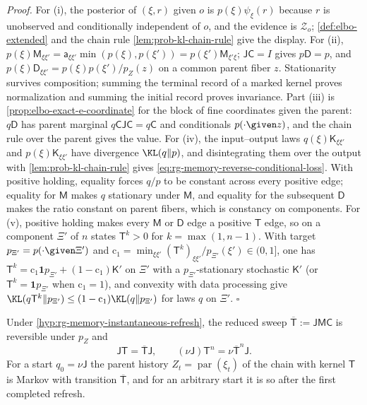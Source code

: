 \noindent\emph{Proof.}
For (i), the posterior of $(\xi,r)$ given $o$ is $p(\xi)\psi_\xi(r)$ because $r$
is unobserved and conditionally independent of $o$, and the evidence is
$\mathcal Z_o$; \cref{def:elbo-extended} and the chain rule
\cref{lem:prob-kl-chain-rule} give the display. For (ii),
$p(\xi)\mathsf M_{\xi\xi'}=\mathsf a_{\xi\xi'}\min(p(\xi),p(\xi'))=p(\xi')\mathsf M_{\xi'\xi}$;
$\mathsf J\mathsf C=I$ gives $p\mathsf D=p$, and
$p(\xi)\mathsf D_{\xi\xi'}=p(\xi)p(\xi')/p_Z(z)$ on a common parent fiber $z$.
Stationarity survives composition; summing the terminal record of a marked kernel
proves normalization and summing the initial record proves invariance. Part (iii) is
\cref{prop:elbo-exact-e-coordinate} for the block of fine coordinates given the
parent: $q\mathsf D$ has parent marginal $q\mathsf C\mathsf J\mathsf C=q\mathsf C$ and
conditionals $p(\cdot\given z)$, and the chain rule over the parent gives the value.
For (iv), the input--output laws $q(\xi)\mathsf K_{\xi\xi'}$ and
$p(\xi)\mathsf K_{\xi\xi'}$ have divergence $\KL(q\Vert p)$, and disintegrating them
over the output with \cref{lem:prob-kl-chain-rule} gives
\eqref{eq:rg-memory-reverse-conditional-loss}. With positive holding, equality forces
$q/p$ to be constant across every positive edge; equality for $\mathsf M$ makes $q$
stationary under $\mathsf M$, and equality for the subsequent $\mathsf D$ makes the
ratio constant on parent fibers, which is constancy on components. For (v), positive
holding makes every $\mathsf M$ or $\mathsf D$ edge a positive $\mathsf T$ edge, so on
a component $\Xi'$ of $n$ states $\mathsf T^k>0$ for $k=\max(1,n-1)$. With target
$p_{\Xi'}=p(\cdot\given\Xi')$ and
$\mathrm c_1=\min_{\xi\xi'}(\mathsf T^k)_{\xi\xi'}/p_{\Xi'}(\xi')\in(0,1]$, one has
$\mathsf T^k=\mathrm c_1\mathbf 1p_{\Xi'}+(1-\mathrm c_1)\mathsf K'$ on $\Xi'$ with a
$p_{\Xi'}$-stationary stochastic $\mathsf K'$ (or $\mathsf T^k=\mathbf 1p_{\Xi'}$ when
$\mathrm c_1=1$), and convexity with data processing give
$\KL(q\mathsf T^k\Vert p_{\Xi'})\leq(1-\mathrm c_1)\KL(q\Vert p_{\Xi'})$ for laws $q$ on
$\Xi'$. $\square$

Under \cref{hyp:rg-memory-instantaneous-refresh}, the reduced sweep
$\overline{\mathsf T}:=\mathsf J\mathsf M\mathsf C$ is reversible under $p_Z$ and
\begin{equation}
\mathsf J\mathsf T=\overline{\mathsf T}\mathsf J,
\qquad
(\nu\mathsf J)\mathsf T^n=\nu\overline{\mathsf T}^n\mathsf J.
\label{eq:rg-memory-parent-semiconjugacy}
\end{equation}
For a start $q_0=\nu\mathsf J$ the parent history $Z_t=\operatorname{par}(\xi_t)$
of the chain with kernel $\mathsf T$ is Markov with transition $\overline{\mathsf T}$,
and for an arbitrary start it is so after the first completed refresh.

